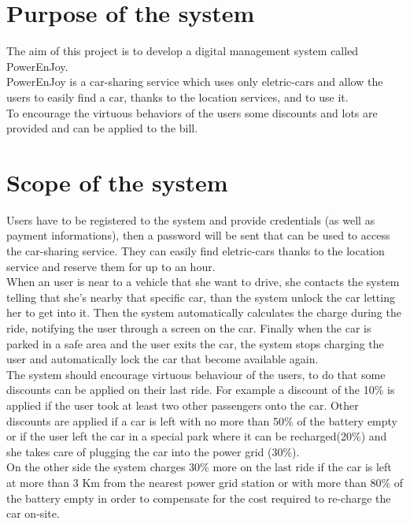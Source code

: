 

\section{Purpose of the system}
The aim of this project is to develop a digital management system called PowerEnJoy. 
\\PowerEnJoy is a car-sharing service which uses only eletric-cars and allow the users to easily find a car, thanks to the location services, and to use it. 
\\To encourage the virtuous behaviors of the users some discounts and lots are provided and can be applied to the bill.
\section{Scope of the system}
Users have to be registered to the system and provide credentials (as well as payment informations), then a password will be sent that can be used to access the car-sharing service. 
They can easily find eletric-cars thanks to the location service and reserve them for up to an hour. 
\\When an user is near to a vehicle that she want to drive, she contacts the system telling that she's nearby that specific car, than the system unlock the car letting her to get into it. 
Then the system automatically calculates the charge during the ride, notifying the user through a screen on the car. 
Finally when the car is parked in a safe area and the user exits the car, the system stops charging the user and automatically lock the car that become available again.
\\The system should encourage virtuous behaviour of the users, %
to do that some discounts can be applied on their last ride. For example a discount of the 10\% is applied if the user took at least two other passengers onto the car. 
Other discounts are applied if a car is left with no more than 50\% of the battery empty or if the user left the car in a special park where it can be recharged(20\%) 
and she takes care of plugging the car into the power grid (30\%). 
\\On the other side the system charges 30\% more on the last ride if the car is left at more than 3 Km from the nearest power grid station or with more than 80\% of the battery empty 
in order to compensate for the cost required to re-charge the car on-site.
